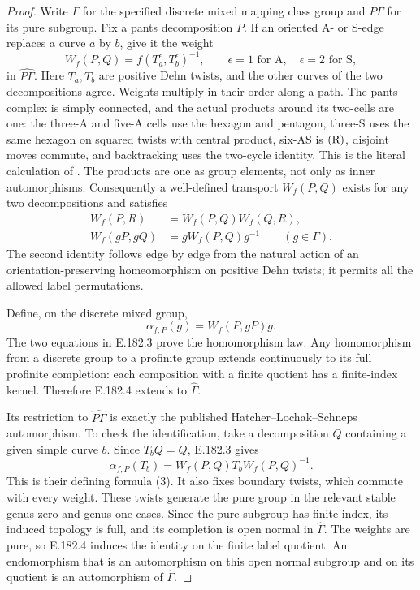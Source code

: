 \begin{proof}
Write \(\Gamma\) for the specified discrete mixed mapping
class group and \(P\Gamma\) for its pure subgroup.
Fix a pants decomposition \(P\).
If an oriented A- or S-edge replaces a curve \(a\) by \(b\),
give it the weight
\[
 W_f(P,Q)=f(T_a^\epsilon,T_b^\epsilon)^{-1},
 \qquad \epsilon=1\text{ for A},\quad
        \epsilon=2\text{ for S},
\tag{E.182.2}
\]
in \(\widehat{P\Gamma}\).
Here \(T_a,T_b\) are positive Dehn twists, and the other
curves of the two decompositions agree.
Weights multiply in their order along a path.
The pants complex is simply connected, and the actual
products around its two-cells are one: the three-A and
five-A cells use the hexagon and pentagon, three-S uses
the same hexagon on squared twists with central product,
six-AS is \(({\rm R})\), disjoint moves commute, and
backtracking uses the two-cycle identity.
This is the literal calculation of
\citet[Theorem 2; proof of Theorem 4, formula (3) and
Lemma 6, pp.18--19]{LitHatcherLochakSchneps2000}.
The products are one as group elements, not only as inner
automorphisms.  Consequently a well-defined transport
\(W_f(P,Q)\) exists for any two decompositions and satisfies
\[
 \begin{aligned}
 W_f(P,R)&=W_f(P,Q)W_f(Q,R),\\
 W_f(gP,gQ)&=gW_f(P,Q)g^{-1}\qquad(g\in\Gamma).
 \end{aligned}
\tag{E.182.3}
\]
The second identity follows edge by edge from the natural
action of an orientation-preserving homeomorphism on positive
Dehn twists; it permits all the allowed label permutations.

Define, on the discrete mixed group,
\[
                     \alpha_{f,P}(g)=W_f(P,gP)g.
\tag{E.182.4}
\]
The two equations in E.182.3 prove the homomorphism law.
Any homomorphism from a discrete group to a profinite group
extends continuously to its full profinite completion:
each composition with a finite quotient has a finite-index
kernel.  Therefore E.182.4 extends to \(\widehat\Gamma\).

Its restriction to \(\widehat{P\Gamma}\) is exactly the
published Hatcher--Lochak--Schneps automorphism.
To check the identification, take a decomposition \(Q\)
containing a given simple curve \(b\).  Since \(T_bQ=Q\),
E.182.3 gives
\[
 \alpha_{f,P}(T_b)
       =W_f(P,Q)T_bW_f(P,Q)^{-1}.
\tag{E.182.5}
\]
This is their defining formula (3).  It also fixes boundary
twists, which commute with every weight.  These twists
generate the pure group in the relevant stable genus-zero
and genus-one cases.  Since the pure subgroup has finite
index, its induced topology is full, and its completion is
open normal in \(\widehat\Gamma\).
The weights are pure, so E.182.4 induces the identity on
the finite label quotient.  An endomorphism that is an
automorphism on this open normal subgroup and on its
quotient is an automorphism of \(\widehat\Gamma\).


\end{proof}
